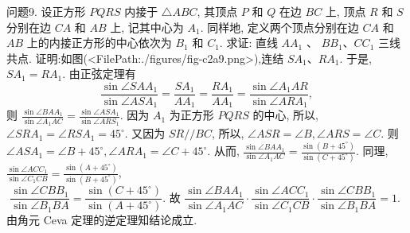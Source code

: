 问题9. 设正方形 $P Q R S$ 内接于 $\triangle A B C$, 其顶点 $P$ 和 $Q$ 在边 $B C$ 上, 顶点 $R$ 和 $S$ 分别在边 $C A$ 和 $A B$ 上, 记其中心为 $A_1$. 同样地, 定义两个顶点分别在边 $C A$ 和 $A B$ 上的内接正方形的中心依次为 $B_1$ 和 $C_1$. 求证: 直线 $A A_1$ 、 $B B_1 、 C C_1$ 三线共点.
证明:如图(<FilePath:./figures/fig-c2a9.png>),连结 $S A_1 、 R A_1$. 于是, $S A_1=R A_1$. 由正弦定理有
$$
\frac{\sin \angle S A A_1}{\sin \angle A S A_1}=\frac{S A_1}{A A_1}=\frac{R A_1}{A A_1}=\frac{\sin \angle A_1 A R}{\sin \angle A R A_1},
$$
则 $\frac{\sin \angle B A A_1}{\sin \angle A_1 A C}=\frac{\sin \angle A S A_1}{\sin \angle A R S_1}$. 因为 $A_1$ 为正方形
$P Q R S$ 的中心, 所以, $\angle S R A_1=\angle R S A_1=45^{\circ}$. 又因为 $S R / / B C$, 所以, $\angle A S R=\angle B, \angle A R S=\angle C$. 则 $\angle A S A_1=\angle B+45^{\circ}, \angle A R A_1=\angle C+45^{\circ}$.
从而, $\frac{\sin \angle B A A_1}{\sin \angle A_1 A C}=\frac{\sin \left(B+45^{\circ}\right)}{\sin \left(C+45^{\circ}\right)}$. 同理, $\frac{\sin \angle A C C_1}{\sin \angle C_1 C B}=\frac{\sin \left(A+45^{\circ}\right)}{\sin \left(B+45^{\circ}\right)}$,
$$
\frac{\sin \angle C B B_1}{\sin \angle B_1 B A}=\frac{\sin \left(C+45^{\circ}\right)}{\sin \left(A+45^{\circ}\right)} \text {. 故 } \frac{\sin \angle B A A_1}{\sin \angle A_1 A C} \cdot \frac{\sin \angle A C C_1}{\sin \angle C_1 C B} \cdot \frac{\sin \angle C B B_1}{\sin \angle B_1 B A}=1 \text {. }
$$
由角元 Ceva 定理的逆定理知结论成立.



